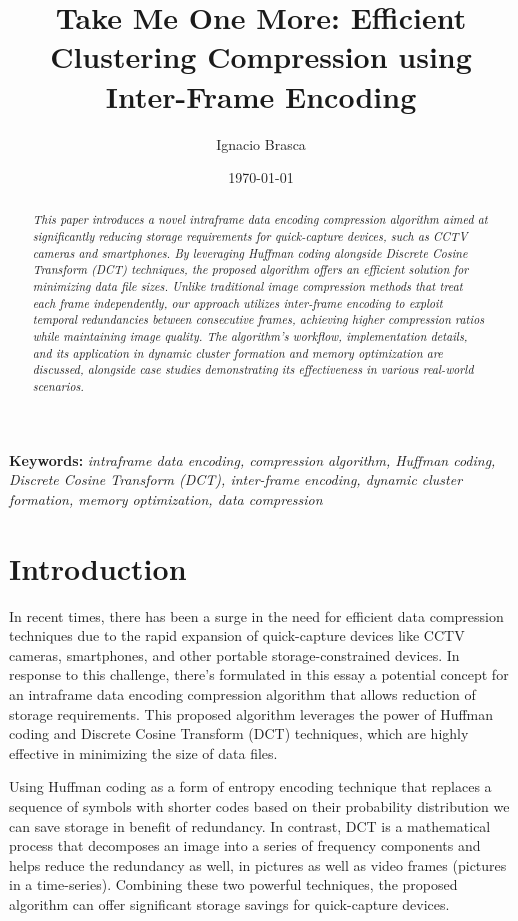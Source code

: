 \documentclass[twocolumn]{article}
\title{Take Me One More: Efficient Clustering Compression using Inter-Frame Encoding}
\author{Ignacio Brasca}
\date{\today}
\begin{document}
\maketitle

\begin{abstract}
    \textit{This paper introduces a novel intraframe data encoding compression algorithm aimed at significantly reducing storage requirements for quick-capture devices, such as CCTV cameras and smartphones. By leveraging Huffman coding alongside Discrete Cosine Transform (DCT) techniques, the proposed algorithm offers an efficient solution for minimizing data file sizes. Unlike traditional image compression methods that treat each frame independently, our approach utilizes inter-frame encoding to exploit temporal redundancies between consecutive frames, achieving higher compression ratios while maintaining image quality. The algorithm's workflow, implementation details, and its application in dynamic cluster formation and memory optimization are discussed, alongside case studies demonstrating its effectiveness in various real-world scenarios.}
    \end{abstract}
    
    \textbf{Keywords:} \textit{intraframe data encoding, compression algorithm, Huffman coding, Discrete Cosine Transform (DCT), inter-frame encoding, dynamic cluster formation, memory optimization, data compression}    
    

\section{Introduction}
In recent times, there has been a surge in the need for efficient data compression techniques due to the rapid expansion of quick-capture devices like CCTV cameras, smartphones, and other portable storage-constrained devices. In response to this challenge, there's formulated in this essay a potential concept for an intraframe data encoding compression algorithm that allows reduction of storage requirements. This proposed algorithm leverages the power of Huffman coding and Discrete Cosine Transform (DCT) techniques, which are highly effective in minimizing the size of data files.

Using Huffman coding as a form of entropy encoding technique that replaces a sequence of symbols with shorter codes based on their probability distribution we can save storage in benefit of redundancy. In contrast, DCT is a mathematical process that decomposes an image into a series of frequency components and helps reduce the redundancy as well, in pictures as well as video frames (pictures in a time-series). Combining these two powerful techniques, the proposed algorithm can offer significant storage savings for quick-capture devices.
\end{document}
